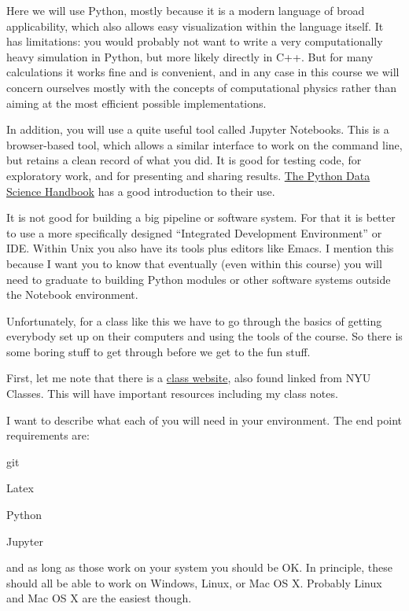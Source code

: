 Here we will use Python, mostly because it is a modern language of
broad applicability, which also allows easy visualization within the
language itself. It has limitations: you would probably not want to
write a very computationally heavy simulation in Python, but more
likely directly in C++. But for many calculations it works fine and is
convenient, and in any case in this course we will concern ourselves
mostly with the concepts of computational physics rather than aiming
at the most efficient possible implementations.

In addition, you will use a quite useful tool called Jupyter
Notebooks. This is a browser-based tool, which allows a similar
interface to work on the command line, but retains a clean record of
what you did. It is good for testing code, for exploratory work, and
for presenting and sharing
results. \href{https://github.com/jakevdp/PythonDataScienceHandbook/tree/de0cc6bd317012d50ab3dd06e3cf4e256de1973f/notebooks}{The
  Python Data Science Handbook} has a good introduction to their use.

It is not good for building a big pipeline or software system. For
that it is better to use a more specifically designed ``Integrated
Development Environment'' or IDE. Within Unix you also have its tools
plus editors like Emacs. I mention this because I want you to know
that eventually (even within this course) you will need to graduate to
building Python modules or other software systems outside the Notebook
environment.

Unfortunately, for a class like this we have to go through the basics
of getting everybody set up on their computers and using the tools of
the course. So there is some boring stuff to get through before we get
to the fun stuff. 

First, let me note that there is a
\href{https://blanton144.github.io/computational/}{\color{red} class
  website}, also found linked from NYU Classes. This will have
important resources including my class notes.

I want to describe what each of you will need in your environment. The
end point requirements are:
\begin{ditemize}
\item git
\item Latex
\item Python
\item Jupyter
\end{ditemize}
and as long as those work on your system you should be OK. In
principle, these should all be able to work on Windows, Linux, or Mac
OS X. Probably Linux and Mac OS X are the easiest though.

